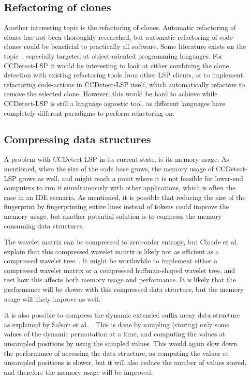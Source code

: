 \subsection*{Refactoring of clones}

Another interesting topic is the refactoring of clones. Automatic refactoring of clones
has not been thoroughly researched, but automatic refactoring of code clones could be
beneficial to practically all software. Some literature exists on the
topic~\cite{TowardsAutomatedRefactoring, RefactoringOrientedClones}, especially targeted
at object-oriented programming languages. For CCDetect-LSP it would be interesting to look
at either combining the clone detection with existing refactoring tools from other LSP
clients, or to implement refactoring code-actions in CCDetect-LSP itself, which
automatically refactors to remove the selected clone. However, this would be hard to
achieve while CCDetect-LSP is still a language agnostic tool, as different languages have
completely different paradigms to perform refactoring on.

\subsection*{Compressing data structures}

A problem with CCDetect-LSP in its current state, is its memory usage. As mentioned, when
the size of the code base grows, the memory usage of CCDetect-LSP grows as well, and might
reach a point where it is not feasible for lower-end computers to run it simultaneously
with other applications, which is often the case in an IDE scenario. As mentioned, it is
possible that reducing the size of the fingerprint by fingerprinting entire lines instead
of tokens could improve the memory usage, but another potential solution is to compress
the memory consuming data structures. 

The wavelet matrix can be compressed to zero-order entropy, but Claude et al. explain that
this compressed wavelet matrix is likely not as efficient as a compressed wavelet
tree~\cite{WaveletMatrix}. It might be worthwhile to implement either a compressed wavelet
matrix or a compressed huffman-shaped wavelet tree, and test how this affects both memory
usage and performance. It is likely that the performance will be slower with this
compressed data structure, but the memory usage will likely improve as well.

It is also possible to compress the dynamic extended suffix array data structure as
explained by Salson et al.~\cite{DynamicExtendedSuffixArrays}. This is done by sampling
(storing) only some values of the dynamic permutation at a time, and computing the values
at unsampled positions by using the sampled values. This would again slow down the
performance of accessing the data structure, as computing the values at unsampled
positions is slower, but it will also reduce the number of values stored, and therefore
the memory usage will be improved.

